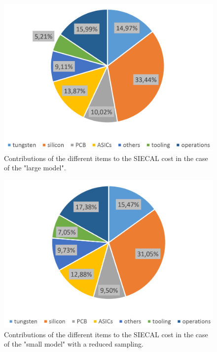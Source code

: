 \begin{figure}[h!]
\centering
\includegraphics[width=0.8\hsize]{Costing/ECallg_Si_cost_sharing.PNG}
\caption{Contributions of the different items to the SIECAL cost in the case of the "large model".}
\label{fig:det:ECal26_Si_cost_sharing}
\end{figure}


\begin{figure}[h!]
\centering
\includegraphics[width=0.8\hsize]{Costing/ECal26_Si_cost_sharing.PNG}
\caption{Contributions of the different items to the SIECAL cost in the case of the "small model" with a reduced sampling.}
\label{fig:det:ECal26_Si_cost_sharing}
\end{figure}

